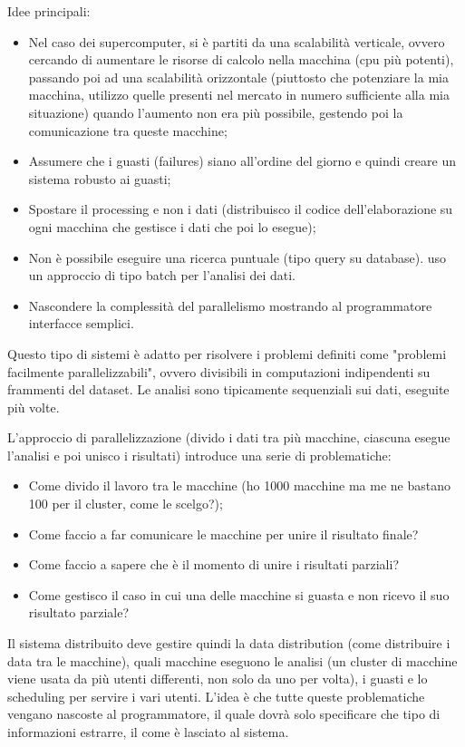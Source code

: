 \documentclass{article}
\begin{document}
Idee principali:
\begin{itemize}
    \item Nel caso dei supercomputer, si è partiti da una scalabilità verticale, ovvero cercando di aumentare le risorse di calcolo nella macchina (cpu più potenti), passando poi ad una scalabilità orizzontale (piuttosto che potenziare la mia macchina, utilizzo quelle presenti nel mercato in numero sufficiente alla mia situazione) quando l'aumento non era più possibile, gestendo poi la comunicazione tra queste macchine;
    \item Assumere che i guasti (failures) siano all'ordine del giorno e quindi creare un sistema robusto ai guasti;
    \item Spostare il processing  e non i dati (distribuisco il codice dell'elaborazione su ogni macchina che gestisce i dati che poi lo esegue);
    \item Non è possibile eseguire una ricerca puntuale (tipo query su database). uso un approccio di tipo batch per l'analisi dei dati.
    \item Nascondere la complessità del parallelismo mostrando al programmatore interfacce semplici.
\end{itemize}

Questo tipo di sistemi è adatto per risolvere i problemi definiti come "problemi facilmente parallelizzabili", ovvero divisibili in computazioni indipendenti su frammenti del dataset. Le analisi sono tipicamente sequenziali sui dati, eseguite più volte.

L'approccio di parallelizzazione (divido i dati tra più macchine, ciascuna esegue l'analisi e poi unisco i risultati) introduce una serie di problematiche:
\begin{itemize}
    \item Come divido il lavoro tra le macchine (ho 1000 macchine ma me ne bastano 100 per il cluster, come le scelgo?);
    \item Come faccio a far comunicare le macchine per unire il risultato finale?
    \item Come faccio a sapere che è il momento di unire i risultati parziali?
    \item Come gestisco il caso in cui una delle macchine si guasta e non ricevo il suo risultato parziale?
\end{itemize}

Il sistema distribuito deve gestire quindi la data distribution (come distribuire i data tra le macchine), quali macchine eseguono le analisi (un cluster di macchine viene usata da più utenti differenti, non solo da uno per volta), i guasti e lo scheduling per servire i vari utenti. L'idea è che tutte queste problematiche vengano nascoste al programmatore, il quale dovrà solo specificare che tipo di informazioni estrarre, il come è lasciato al sistema.
\end{document}
